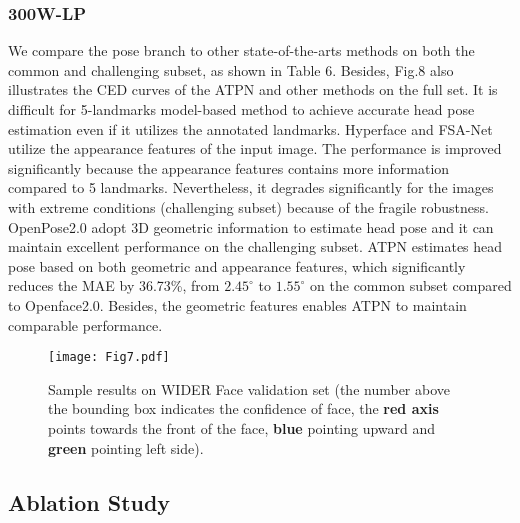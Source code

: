 \documentclass[3p,twocolumn, round, sort & compress]{elsarticle}
\begin{document}
\subsubsection{300W-LP}
We compare the pose branch to other state-of-the-arts methods on both the common and challenging subset, as shown in Table 6. Besides, Fig.8 also illustrates the CED curves of the ATPN and other methods on the full set. It is difficult for 5-landmarks model-based method to achieve accurate head pose estimation even if it utilizes the annotated landmarks. Hyperface and FSA-Net utilize the appearance features of the input image. The performance is improved significantly because the appearance features contains more information compared to 5 landmarks. Nevertheless, it degrades significantly for the images with extreme conditions (challenging subset) because of the fragile robustness. OpenPose2.0 adopt 3D geometric information to estimate head pose and it can maintain excellent performance on the challenging subset. ATPN estimates head pose based on both geometric and appearance features, which significantly reduces the MAE by 36.73\%, from $2.45^\circ$ to $1.55^\circ$ on the common subset compared to Openface2.0. Besides, the geometric features enables ATPN to maintain comparable performance. 



\begin{figure*}[t!]
	\centering
	\texttt{[image: Fig7.pdf]}
	\caption{Sample results on WIDER Face validation set (the number above the bounding box indicates the confidence of face, the {\color{red} \textbf{red axis}} points towards the front of the face, {\color{blue} \textbf{blue}} pointing upward and {\color{green} \textbf{green}} pointing left side).}
	\label{fig7}
\end{figure*}

\subsection{Ablation Study}
\end{document}
